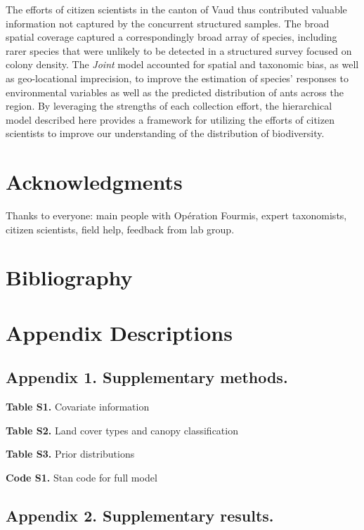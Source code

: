 \documentclass[preprint,review,times,12pt,3p]{elsarticle}
\begin{document}
The efforts of citizen scientists in the canton of Vaud thus contributed valuable information not captured by the concurrent structured samples. The broad spatial coverage captured a correspondingly broad array of species, including rarer species that were unlikely to be detected in a structured survey focused on colony density. The \emph{Joint} model accounted for spatial and taxonomic bias, as well as geo-locational imprecision, to improve the estimation of species' responses to environmental variables as well as the predicted distribution of ants across the region. By leveraging the strengths of each collection effort, the hierarchical model described here provides a framework for utilizing the efforts of citizen scientists to improve our understanding of the distribution of biodiversity.




\section{Acknowledgments}
Thanks to everyone: main people with Opération Fourmis, expert taxonomists, citizen scientists, field help, feedback from lab group.

\newpage
\section{Bibliography}




\newpage
\section{Appendix Descriptions}

\subsection{Appendix 1. Supplementary methods.}

\textbf{Table S1.} Covariate information

\textbf{Table S2.} Land cover types and canopy classification

\textbf{Table S3.} Prior distributions

\textbf{Code S1.} Stan code for full model



\subsection{Appendix 2. Supplementary results.}
\end{document}

